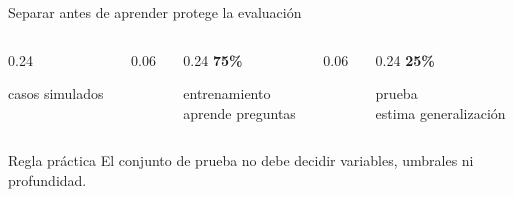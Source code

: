 \documentclass[aspectratio=169,11pt]{beamer}
\newcommand{\framesource}{}
\newcommand{\source}[1]{%
  \gdef\framesource{Fuente: #1}%
}
\begin{document}
\begin{frame}{Separar antes de aprender protege la evaluación}
  \vspace{0.55cm}
  \begin{columns}[c,onlytextwidth]
    \begin{column}{0.24\textwidth}
      \centering
      {\color{Petroleo}\fontsize{28}{31}\selectfont\bfseries \NTotal}\par
      \vspace{0.12cm}\large casos simulados
    \end{column}
    \begin{column}{0.06\textwidth}
      \centering{\color{Gris}\Large$\longrightarrow$}
    \end{column}
    \begin{column}{0.24\textwidth}
      \centering
      {\color{Petroleo}\fontsize{28}{31}\selectfont\bfseries 75\%}\par
      \vspace{0.12cm}\large entrenamiento\\[-0.1cm]
      \small aprende preguntas
    \end{column}
    \begin{column}{0.06\textwidth}
      \centering{\color{Gris}\Large$\longrightarrow$}
    \end{column}
    \begin{column}{0.24\textwidth}
      \centering
      {\color{Coral!90!black}\fontsize{28}{31}\selectfont\bfseries 25\%}\par
      \vspace{0.12cm}\large prueba\\[-0.1cm]
      \small estima generalización
    \end{column}
  \end{columns}
  \vspace{1.15cm}
  \begin{block}{Regla práctica}
    El conjunto de prueba no debe decidir variables, umbrales ni profundidad.
  \end{block}
  \source{Partición estratificada; semilla 42.}
\end{frame}
\end{document}

